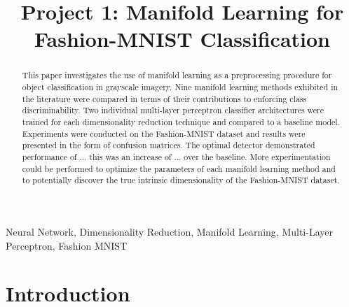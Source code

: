 \documentclass[conference]{IEEEtran}
\begin{document}
\title{Project 1: Manifold Learning for Fashion-MNIST Classification}
\author{

}

\maketitle


\begin{abstract}
	This paper investigates the use of manifold learning as a preprocessing procedure for object classification in grayscale imagery.  Nine manifold learning methods exhibited in the literature were compared in terms of their contributions to enforcing class discriminability.  Two individual multi-layer perceptron classifier architectures were trained for each dimensionality reduction technique and compared to a baseline model. Experiments were conducted on the Fashion-MNIST dataset and results were presented in the form of confusion matrices.  The optimal detector demonstrated performance of ... this was an increase of ... over the baseline.  More experimentation could be performed to optimize the parameters of each manifold learning method and to potentially discover the true intrinsic dimensionality of the Fashion-MNIST dataset.
\end{abstract} 

\begin{IEEEkeywords}
Neural Network, Dimensionality Reduction, Manifold Learning, Multi-Layer Perceptron, Fashion MNIST
\end{IEEEkeywords}


\section{Introduction} 
\end{document}
